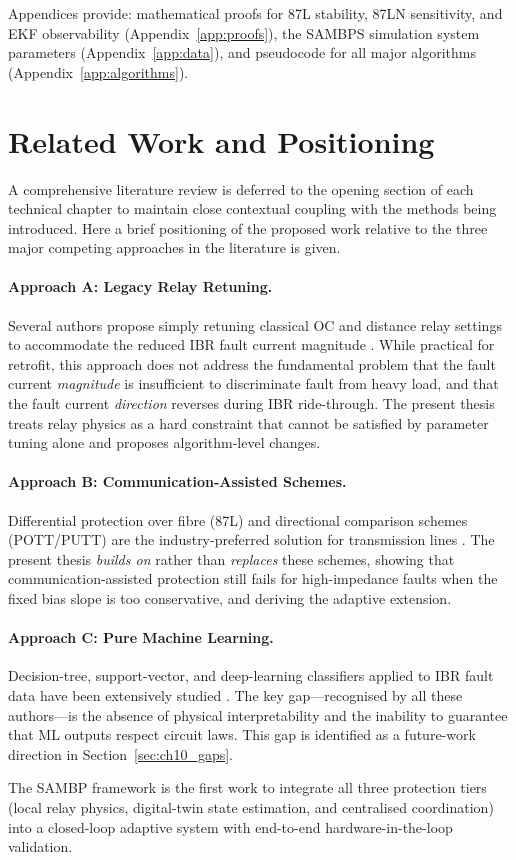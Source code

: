 Appendices provide: mathematical proofs for 87L stability, 87LN sensitivity,
and EKF observability (Appendix~\ref{app:proofs}), the SAMBPS simulation
system parameters (Appendix~\ref{app:data}), and pseudocode for all major
algorithms (Appendix~\ref{app:algorithms}).

\section{Related Work and Positioning}
\label{sec:ch1_literature}

A comprehensive literature review is deferred to the opening section of
each technical chapter to maintain close contextual coupling with the
methods being introduced. Here a brief positioning of the proposed work
relative to the three major competing approaches in the literature is given.

\paragraph{Approach A: Legacy Relay Retuning.}
Several authors propose simply retuning classical OC and distance relay
settings to accommodate the reduced IBR fault current magnitude
\citep{Hooshyar2019, Sadeghi2021}. While practical for retrofit, this approach
does not address the fundamental problem that the fault current \emph{magnitude}
is insufficient to discriminate fault from heavy load, and that the fault
current \emph{direction} reverses during IBR ride-through. The present
thesis treats relay physics as a hard constraint that cannot be satisfied
by parameter tuning alone and proposes algorithm-level changes.

\paragraph{Approach B: Communication-Assisted Schemes.}
Differential protection over fibre (87L) and directional comparison schemes
(POTT/PUTT) are the industry-preferred solution for transmission lines
\citep{Gers2011, Zhang2020POTT}. The present thesis \emph{builds on} rather
than \emph{replaces} these schemes, showing that communication-assisted
protection still fails for high-impedance faults when the fixed bias slope
is too conservative, and deriving the adaptive extension.

\paragraph{Approach C: Pure Machine Learning.}
Decision-tree, support-vector, and deep-learning classifiers applied to
IBR fault data have been extensively studied \citep{Jamali2020, Liao2022DNN}.
The key gap—recognised by all these authors—is the absence of physical
interpretability and the inability to guarantee that ML outputs respect
circuit laws. This gap is identified as a future-work direction in
Section~\ref{sec:ch10_gaps}.

The SAMBP framework is the first work to integrate all three protection
tiers (local relay physics, digital-twin state estimation, and centralised
coordination) into a closed-loop adaptive system with end-to-end
hardware-in-the-loop validation.
